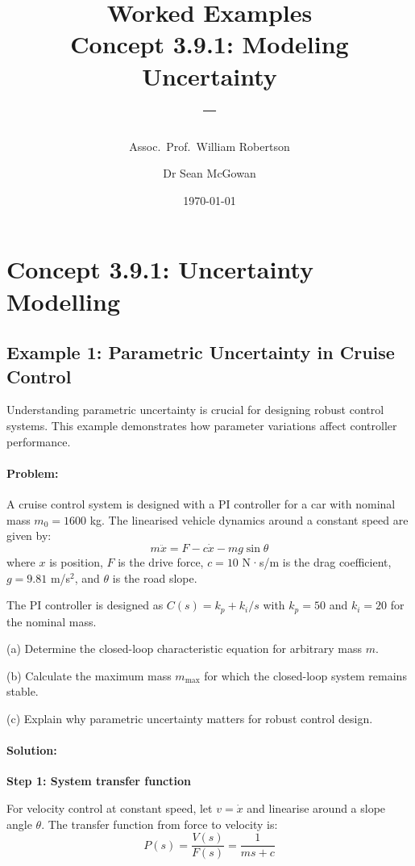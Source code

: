\documentclass[11pt,a4paper]{article}
\title{\textbf{Worked Examples}\\[0.5em]
\large Concept 3.9.1: Modeling Uncertainty\\[0.3em]
\normalsize \coursesubtitle{} -- \coursetitle}
\author{Assoc.\ Prof.\ William Robertson \and Dr Sean McGowan}
\date{\today}
\begin{document}
\maketitle
\tableofcontents
\newpage

\section{Concept 3.9.1: Uncertainty Modelling}

\subsection{Example 1: Parametric Uncertainty in Cruise Control}

Understanding parametric uncertainty is crucial for designing robust control systems. This example demonstrates how parameter variations affect controller performance.

\paragraph{Problem:}
A cruise control system is designed with a PI controller for a car with nominal mass $m_0 = 1600$ kg. The linearised vehicle dynamics around a constant speed are given by:
\begin{equation}
  m\ddot{x} = F - c\dot{x} - mg\sin\theta
\end{equation}
where $x$ is position, $F$ is the drive force, $c = 10$ N·s/m is the drag coefficient, $g = 9.81$ m/s$^2$, and $\theta$ is the road slope.

The PI controller is designed as $C(s) = k_p + k_i/s$ with $k_p = 50$ and $k_i = 20$ for the nominal mass.

(a) Determine the closed-loop characteristic equation for arbitrary mass $m$.

(b) Calculate the maximum mass $m_{\max}$ for which the closed-loop system remains stable.

(c) Explain why parametric uncertainty matters for robust control design.

\paragraph{Solution:}

\textbf{Step 1: System transfer function}

For velocity control at constant speed, let $v = \dot{x}$ and linearise around a slope angle $\theta$. The transfer function from force to velocity is:
\begin{equation}
  P(s) = \frac{V(s)}{F(s)} = \frac{1}{ms + c}
\end{equation}
\end{document}

